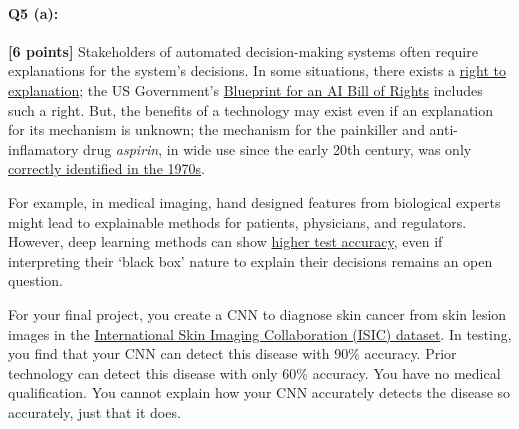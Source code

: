 \begin{enumerate}[(a)]

\end{enumerate}


\pagebreak

\paragraph{Q5 (a):} \textbf{[6 points]} Stakeholders of automated decision-making systems often require explanations for the system's decisions. In some situations, there exists a \href{https://en.wikipedia.org/wiki/Right_to_explanation}{right to explanation}; the US Government's \href{https://www.whitehouse.gov/ostp/ai-bill-of-rights/}{Blueprint for an AI Bill of Rights} includes such a right. But, the benefits of a technology may exist even if an explanation for its mechanism is unknown; the mechanism for the painkiller and anti-inflamatory drug \emph{aspirin}, in wide use since the early 20th century, was only \href{https://en.wikipedia.org/wiki/History_of_aspirin#Investigating_how_aspirin_works}{correctly identified in the 1970s}.

For example, in medical imaging, hand designed features from biological experts might lead to explainable methods for patients, physicians, and regulators. However, deep learning methods can show \href{https://drive.google.com/file/d/1bDAqEtW482OJeqMBt5A4AradVa4gf_o9/view}{higher test accuracy}, even if interpreting their `black box' nature to explain their decisions remains an open question.

For your final project, you create a CNN to diagnose skin cancer from skin lesion images in the \href{https://challenge2020.isic-archive.com/}{International Skin Imaging Collaboration (ISIC) dataset}. In testing, you find that your CNN can detect this disease with 90\% accuracy. Prior technology can detect this disease with only 60\% accuracy. You have no medical qualification. You cannot explain how your CNN accurately detects the disease so accurately, just that it does.

